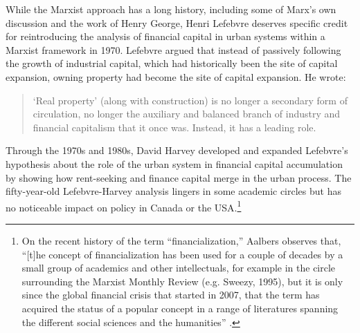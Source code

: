 While the Marxist approach has a long history, including some of Marx's own discussion and the work of Henry George,  Henri Lefebvre %
\cite{lefebvreRevolutionUrbaine1970, lefebvreUrbanRevolution2003}  deserves specific credit for  reintroducing the analysis of financial capital in urban systems within a Marxist framework in 1970. Lefebvre argued that instead of passively following the growth of industrial capital, which had historically been the site of capital expansion,  owning property had become the site of capital expansion.  He wrote:
\begin{quotation}
\noindent ‘Real property’ (along with construction) is no longer a secondary form of circulation, no longer the auxiliary and balanced branch of industry and financial capitalism that it once was. Instead, it has a leading role. 
\end{quotation}

Through the 1970s and 1980s, David Harvey \cite{harveyClassmonopolyRentFinance1974} developed and expanded Lefebvre’s hypothesis about the role of the urban system in financial capital accumulation by showing how rent-seeking and finance capital merge in the urban process. The fifty-year-old Lefebvre-Harvey analysis lingers in some academic circles but has no noticeable impact on policy in Canada or the USA.\footnote{On the recent history of the term ``financialization,'' Aalbers observes that, ``[t]he concept of financialization has been used for a couple of decades by a small group of academics and other intellectuals, for example in the circle surrounding the Marxist Monthly Review (e.g. Sweezy, 1995), but it is only since the global financial crisis that started in 2007, that the term has acquired the status of a popular concept in a range of literatures spanning the different social sciences and the humanities'' \cite{aalbersVariegatedFinancializationHousing2017}.}  











